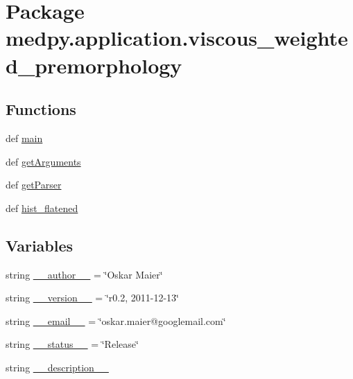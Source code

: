 \hypertarget{namespacemedpy_1_1application_1_1viscous__weighted__premorphology}{
\section{Package medpy.application.viscous\_\-weighted\_\-premorphology}
\label{namespacemedpy_1_1application_1_1viscous__weighted__premorphology}
}
\subsection*{Functions}
\begin{DoxyCompactItemize}
\item 
def \hyperlink{namespacemedpy_1_1application_1_1viscous__weighted__premorphology_a3954b05d0cd5004044c4d28684d710fc}{main}
\item 
def \hyperlink{namespacemedpy_1_1application_1_1viscous__weighted__premorphology_ac2830a43193730db1999a76dcdf86466}{getArguments}
\item 
def \hyperlink{namespacemedpy_1_1application_1_1viscous__weighted__premorphology_a3ebe2ee815160dcc9d5efa4c99b41301}{getParser}
\item 
def \hyperlink{namespacemedpy_1_1application_1_1viscous__weighted__premorphology_af04c07605b7c479202e54d98952add4d}{hist\_\-flatened}
\end{DoxyCompactItemize}
\subsection*{Variables}
\begin{DoxyCompactItemize}
\item 
string \hyperlink{namespacemedpy_1_1application_1_1viscous__weighted__premorphology_a5a3f94f3a2810fe0bf017454bd8421db}{\_\-\_\-author\_\-\_\-} = \char`\"{}Oskar Maier\char`\"{}
\item 
string \hyperlink{namespacemedpy_1_1application_1_1viscous__weighted__premorphology_a025df249e01a30e56dc404fa6eb462a0}{\_\-\_\-version\_\-\_\-} = \char`\"{}r0.2, 2011-\/12-\/13\char`\"{}
\item 
string \hyperlink{namespacemedpy_1_1application_1_1viscous__weighted__premorphology_a983abeda72c63597deaa19c226a72cfe}{\_\-\_\-email\_\-\_\-} = \char`\"{}oskar.maier@googlemail.com\char`\"{}
\item 
string \hyperlink{namespacemedpy_1_1application_1_1viscous__weighted__premorphology_a89cb4a3009d7fd6a5487431d91396344}{\_\-\_\-status\_\-\_\-} = \char`\"{}Release\char`\"{}
\item 
string \hyperlink{namespacemedpy_1_1application_1_1viscous__weighted__premorphology_a86ed5b3fbcc76345e47339be6ae007a8}{\_\-\_\-description\_\-\_\-}
\end{DoxyCompactItemize}


